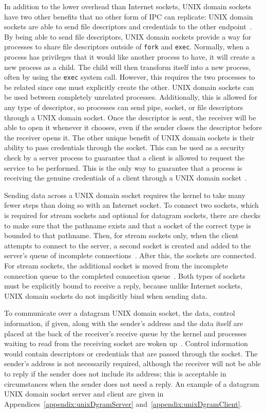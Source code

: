 In addition to the lower overhead than Internet sockets, UNIX domain sockets have two other benefits that no other form of IPC can replicate: UNIX domain sockets are able to send file descriptors and credentials to the other endpoint~\cite[p 381--394]{Stevens:1997:UNP:522800}.  By being able to send file descriptors, UNIX domain sockets provide a way for processes to share file descriptors outside of \texttt{fork} and \texttt{exec}.  Normally, when a process has privileges that it would like another process to have, it will create a new process as a child.  The child will then transform itself into a new process, often by using the \texttt{exec} system call.  However, this requires the two processes to be related since one must explicitly create the other.  UNIX domain sockets can be used between completely unrelated processes.  Additionally, this is allowed for any type of descriptor, so processes can send pipe, socket, or file descriptors through a UNIX domain socket.  Once the descriptor is sent, the receiver will be able to open it whenever it chooses, even if the sender closes the descriptor before the receiver opens it.  The other unique benefit of UNIX domain sockets is their ability to pass credentials through the socket.  This can be used as a security check by a server process to guarantee that a client is allowed to request the service to be performed.  This is the only way to guarantee that a process is receiving the genuine credentials of a client through a UNIX domain socket~\cite[p 391]{Stevens:1997:UNP:522800}.

Sending data across a UNIX domain socket requires the kernel to take many fewer steps than doing so with an Internet socket.  To connect two sockets, which is required for stream sockets and optional for datagram sockets, there are checks to make sure that the pathname exists and that a socket of the correct type is bounded to that pathname.  Then, for stream sockets only, when the client attempts to connect to the server, a second socket is created and added to the server's queue of incomplete connections~\cite[p 240--245]{Stevens:1996:TIT:233130}.  After this, the sockets are connected.  For stream sockets, the additional socket is moved from the incomplete connection queue to the completed connection queue~\cite[p 245--249]{Stevens:1996:TIT:233130}.  Both types of sockets must be explicitly bound to receive a reply, because unlike Internet sockets, UNIX domain sockets do not implicitly bind when sending data.

To communicate over a datagram UNIX domain socket, the data, control information, if given, along with the sender's address and the data itself are placed at the back of the receiver's receive queue by the kernel and processes waiting to read from the receiving socket are woken up~\cite[p 263--265]{Stevens:1996:TIT:233130}.  Control information would contain descriptors or credentials that are passed through the socket.  The sender's address is not necessarily required, although the receiver will not be able to reply if the sender does not include its address; this is acceptable in circumstances when the sender does not need a reply.  An example of a datagram UNIX domain socket server and client are given in Appendices~\ref{appendix:unixDgramServer} and~\ref{appendix:unixDgramClient}.

